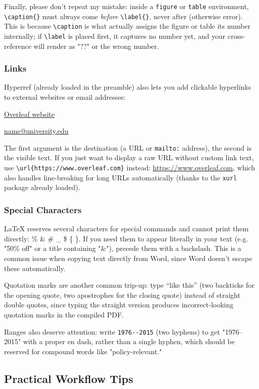 Finally, please don't repeat my mistake: inside a \texttt{figure} or \texttt{table} environment, \verb|\caption{}| must always come \emph{before} \verb|\label{}|, never after (otherwise error). This is because \verb|\caption| is what actually assigns the figure or table its number internally; if \verb|\label| is placed first, it captures no number yet, and your cross-reference will render as "??" or the wrong number.

\subsubsection*{Links}
Hyperref (already loaded in the preamble) also lets you add clickable hyperlinks to external websites or email addresses:

\href{https://www.overleaf.com}{Overleaf website}

\href{mailto:name@university.edu}{name@university.edu}

The first argument is the destination (a URL or \texttt{mailto:} address), the second is the visible text. If you just want to display a raw URL without custom link text, use \verb|\url{https://www.overleaf.com}| instead: \url{https://www.overleaf.com}, which also handles line-breaking for long URLs automatically (thanks to the \texttt{xurl} package already loaded).

\subsubsection*{Special Characters}
LaTeX reserves several characters for special commands and cannot print them directly: \% \& \# \_ \$ \{ \}. If you need them to appear literally in your text (e.g. "50\% off" or a title containing "\&"), precede them with a backslash. This is a common issue when copying text directly from Word, since Word doesn't escape these automatically.

Quotation marks are another common trip-up: type ``like this'' (two backticks for the opening quote, two apostrophes for the closing quote) instead of straight double quotes, since typing the straight version produces incorrect-looking quotation marks in the compiled PDF.

Ranges also deserve attention: write \verb|1976--2015| (two hyphens) to get "1976--2015" with a proper en dash, rather than a single hyphen, which should be reserved for compound words like "policy-relevant."

\subsection*{Practical Workflow Tips}

